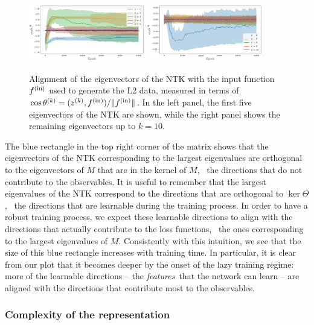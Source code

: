 \begin{figure}[ht!]
  \centering
  \includegraphics[width=0.45\textwidth]{plots/ntk_pheno/ntk_align_fin_1_L2}
  \includegraphics[width=0.45\textwidth]{plots/ntk_pheno/ntk_align_fin_2_L2}
  \caption{Alignment of the eigenvectors of the NTK with the input function
  $f^{\rm(in)}$ used to generate the L2 data, measured in terms of $\cos
  \theta^{(k)} = (z^{(k)}, f^{\rm{(in)}})/ \Vert f^{\rm{(in)}}\Vert$. In the
  left panel, the first five eigenvectors of the NTK are shown, while the right
  panel shows the remaining eigenvectors up to $k=10$.}
  \label{fig:NtkAlignFin}
\end{figure}
The blue rectangle in the top right corner of the matrix shows that the
eigenvectors of the NTK corresponding to the largest eigenvalues are orthogonal
to the eigenvectors of $M$ that are in the kernel of $M$, \ie\ the directions
that do not contribute to the observables. It is useful to remember that the
largest eigenvalues of the NTK correspond to the directions that are orthogonal
to $\ker\Theta$, \ie\ the directions that are learnable during the training
process. In order to have a robust training process, we expect these learnable
directions to align with the directions that actually contribute to the loss
functions, \ie\ the ones corresponding to the largest eigenvalues of $M$.
Consistently with this intuition, we see that the size of this blue rectangle
increases with training time. In particular, it is clear from our plot that it
becomes deeper by the onset of the lazy training regime: more of the learnable
directions -- the {\it features}\ that the network can learn -- are aligned with
the directions that contribute most to the observables. 

\subsubsection{Complexity of the representation}

\FloatBarrier
